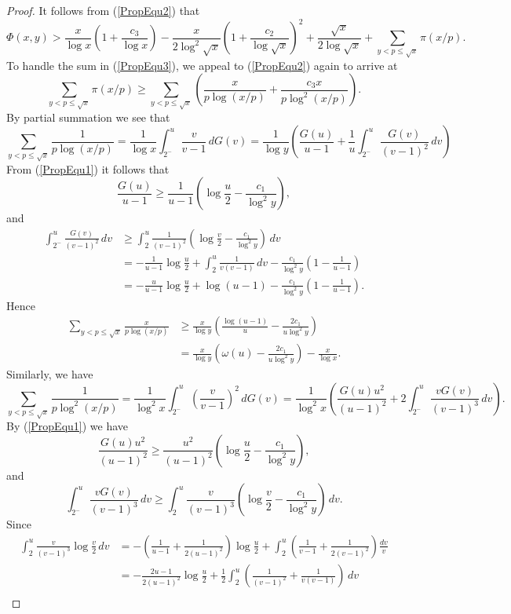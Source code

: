 \documentclass[12pt,reqno]{amsart}
\begin{document}
\begin{proof}
It follows from (\ref{PropEqu2}) that 
\begin{equation}\label{PropEqu3}
\Phi(x,y)>\frac{x}{\log x}\left(1+\frac{c_3}{\log x}\right)-\frac{x}{2\log^2\sqrt{x}}\left(1+\frac{c_2}{\log\sqrt{x}}\right)^2+\frac{\sqrt{x}}{2\log\sqrt{x}}+\sum_{y<p\leq \sqrt{x}}\pi(x/p).
\end{equation}
To handle the sum in (\ref{PropEqu3}), we appeal to (\ref{PropEqu2}) again to arrive at
\[\sum_{y<p\leq \sqrt{x}}\pi(x/p)\ge\sum_{y<p\le\sqrt{x}}\left(\frac{x}{p\log(x/p)}+\frac{c_3x}{p\log^2(x/p)}\right).\]
By partial summation we see that
\[\sum_{y<p\le \sqrt{x}}\frac{1}{p\log(x/p)}=\frac{1}{\log x}\int_{2^-}^{u}\frac{v}{v-1}\,dG(v)=\frac{1}{\log y}\left(\frac{G(u)}{u-1}+\frac{1}{u}\int_{2^-}^{u}\frac{G(v)}{(v-1)^2}\,dv\right)\]
From (\ref{PropEqu1}) it follows that
\[\frac{G(u)}{u-1}\ge\frac{1}{u-1}\left(\log\frac{u}{2}-\frac{c_1}{\log^2y}\right),\]
and
\begin{align*}
\int_{2^-}^{u}\frac{G(v)}{(v-1)^2}\,dv&\ge\int_{2}^{u}\frac{1}{(v-1)^2}\left(\log\frac{v}{2}-\frac{c_1}{\log^2y}\right)\,dv\\
&=-\frac{1}{u-1}\log\frac{u}{2}+\int_{2}^{u}\frac{1}{v(v-1)}\,dv-\frac{c_1}{\log^2y}\left(1-\frac{1}{u-1}\right)\\
&=-\frac{u}{u-1}\log\frac{u}{2}+\log(u-1)-\frac{c_1}{\log^2y}\left(1-\frac{1}{u-1}\right).
\end{align*}
Hence
\begin{align}\label{PropEqu4}
\sum_{y<p\le \sqrt{x}}\frac{x}{p\log(x/p)}&\ge \frac{x}{\log y}\left(\frac{\log(u-1)}{u}-\frac{2c_1}{u\log^2y}\right) \nonumber\\
&=\frac{x}{\log y}\left(\omega(u)-\frac{2c_1}{u\log^2y}\right)-\frac{x}{\log x}.
\end{align}
Similarly, we have
\[\sum_{y<p\le \sqrt{x}}\frac{1}{p\log^2(x/p)}=\frac{1}{\log^2 x}\int_{2^-}^{u}\left(\frac{v}{v-1}\right)^2\,dG(v)=\frac{1}{\log^2 x}\left(\frac{G(u)u^2}{(u-1)^2}+2\int_{2^-}^{u}\frac{vG(v)}{(v-1)^3}\,dv\right).\]
By (\ref{PropEqu1}) we have
\[\frac{G(u)u^2}{(u-1)^2}\ge\frac{u^2}{(u-1)^2}\left(\log\frac{u}{2}-\frac{c_1}{\log^2y}\right),\]
and
\[\int_{2^-}^{u}\frac{vG(v)}{(v-1)^3}\,dv\ge\int_{2}^{u}\frac{v}{(v-1)^3}\left(\log\frac{v}{2}-\frac{c_1}{\log^2y}\right)\,dv.\]
Since
\begin{align*}
\int_{2}^{u}\frac{v}{(v-1)^3}\log\frac{v}{2}\,dv&=-\left(\frac{1}{u-1}+\frac{1}{2(u-1)^2}\right)\log\frac{u}{2}+\int_{2}^{u}\left(\frac{1}{v-1}+\frac{1}{2(v-1)^2}\right)\frac{dv}{v}\\
&=-\frac{2u-1}{2(u-1)^2}\log\frac{u}{2}+\frac{1}{2}\int_{2}^{u}\left(\frac{1}{(v-1)^2}+\frac{1}{v(v-1)}\right)\,dv\\

\end{align*}
\end{proof}
\end{document}

